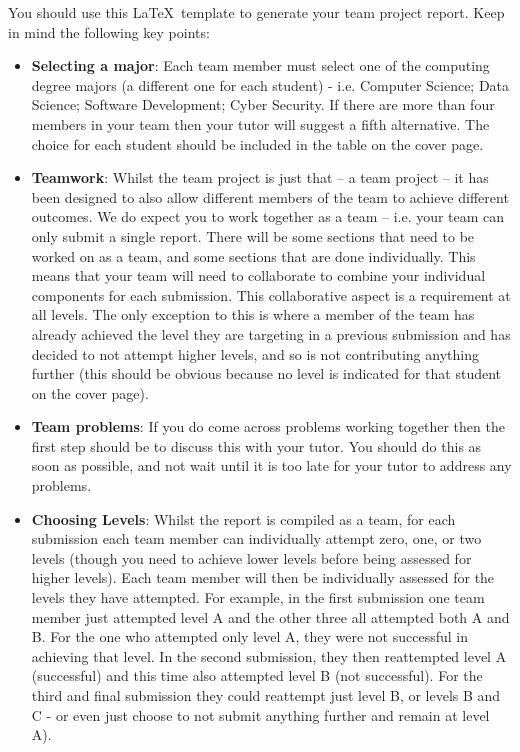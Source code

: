 \documentclass[a4paper, 11pt]{report}
\begin{document}
You should use this \LaTeX\ template to generate your team project report. Keep in mind the following key points:
\begin{itemize}
	\item \textbf{Selecting a major}: Each team member must select one of the computing degree majors (a different one for each student) - i.e. Computer Science; Data Science; Software Development; Cyber Security. If there are more than four members in your team then your tutor will suggest a fifth alternative. The choice for each student should be included in the table on the cover page.
	\item \textbf{Teamwork}: Whilst the team project is just that -- a team project -- it has been designed to also allow different members of the team to achieve different outcomes. We do expect you to work together as a team -- i.e. your team can only submit a single report. There will be some sections that need to be worked on as a team, and some sections that are done individually. This means that your team will need to collaborate to combine your individual components for each submission. This collaborative aspect is a requirement at all levels. The only exception to this is where a member of the team has already achieved the level they are targeting in a previous submission and has decided to not attempt higher levels, and so is not contributing anything further (this should be obvious because no level is indicated for that student on the cover page).
	\item \textbf{Team problems}: If you do come across problems working together then the first step should be to discuss this with your tutor. You should do this as soon as possible, and not wait until it is too late for your tutor to address any problems.
	\item \textbf{Choosing Levels}: Whilst the report is compiled as a team, for each submission each team member can individually attempt zero, one, or two levels (though you need to achieve lower levels before being assessed for higher levels). Each team member will then be individually assessed for the levels they have attempted. For example, in the first submission one team member just attempted level A and the other three all attempted both A and B. For the one who attempted only level A, they were not successful in achieving that level. In the second submission, they then reattempted level A (successful) and this time also attempted level B (not successful). For the third and final submission they could reattempt just level B, or levels B and C - or even just choose to not submit anything further and remain at level A).

\end{itemize}
\end{document}
